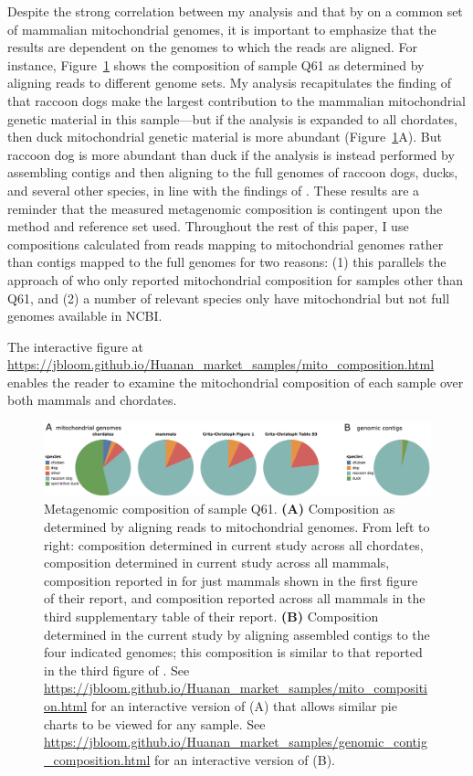 \documentclass[9pt,twocolumn,twoside]{gsajnl_modified}
\begin{document}
Despite the strong correlation between my analysis and that by \citet{crits2023genetic} on a common set of mammalian mitochondrial genomes, it is important to emphasize that the results are dependent on the genomes to which the reads are aligned.
For instance, Figure~\ref{fig:composition} shows the composition of sample Q61 as determined by aligning reads to different genome sets.
My analysis recapitulates the finding of \citet{crits2023genetic} that raccoon dogs make the largest contribution to the mammalian mitochondrial genetic material in this sample---but if the analysis is expanded to all chordates, then duck mitochondrial genetic material is more abundant (Figure~\ref{fig:composition}A).
But raccoon dog is more abundant than duck if the analysis is instead performed by assembling contigs and then aligning to the full genomes of raccoon dogs, ducks, and several other species, in line with the findings of \citet{crits2023genetic}.
These results are a reminder that the measured metagenomic composition is contingent upon the method and reference set used.
Throughout the rest of this paper, I use compositions calculated from reads mapping to mitochondrial genomes rather than contigs mapped to the full genomes for two reasons: (1) this parallels the approach of \citet{crits2023genetic} who only reported mitochondrial composition for samples other than Q61, and (2) a number of relevant species only have mitochondrial but not full genomes available in NCBI.

The interactive figure at \url{https://jbloom.github.io/Huanan_market_samples/mito_composition.html} enables the reader to examine the mitochondrial composition of each sample over both mammals and chordates.

\begin{figure}
\includegraphics[width=\linewidth]{figures/composition.pdf}
\caption{
Metagenomic composition of sample Q61.
{\bf (A)}
Composition as determined by aligning reads to mitochondrial genomes.
From left to right: composition determined in current study across all chordates, composition determined in current study across all mammals, composition reported in \citet{crits2023genetic} for just mammals shown in the first figure of their report, and composition reported \citet{crits2023genetic} across all mammals in the third supplementary table of their report.
{\bf (B)}
Composition determined in the current study by aligning assembled contigs to the four indicated genomes; this composition is similar to that reported in the third figure of \citet{crits2023genetic}.
See \url{https://jbloom.github.io/Huanan_market_samples/mito_composition.html} for an interactive version of (A) that allows similar pie charts to be viewed for any sample.
See \url{https://jbloom.github.io/Huanan_market_samples/genomic_contig_composition.html} for an interactive version of (B).
\label{fig:composition}
}
\end{figure}
\end{document}
